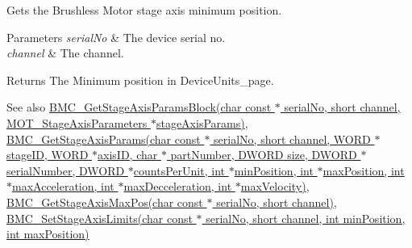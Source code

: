 Gets the Brushless Motor stage axis minimum position. 


\begin{DoxyParams}{Parameters}
{\em serial\+No} & The device serial no. \\
\hline
{\em channel} & The channel. \\
\hline
\end{DoxyParams}
\begin{DoxyReturn}{Returns}
The Minimum position in Device\+Units\+\_\+page. 
\end{DoxyReturn}
\begin{DoxySeeAlso}{See also}
\hyperlink{group___benchtop_brushless_motor_ga62f0ae202868a37a35bab403479ded0e}{B\+M\+C\+\_\+\+Get\+Stage\+Axis\+Params\+Block(char const $\ast$ serial\+No, short channel, M\+O\+T\+\_\+\+Stage\+Axis\+Parameters $\ast$stage\+Axis\+Params)}, \hyperlink{group___benchtop_brushless_motor_ga789b025855ca66786c36428ee7406b02}{B\+M\+C\+\_\+\+Get\+Stage\+Axis\+Params(char const $\ast$ serial\+No, short channel, W\+O\+R\+D $\ast$stage\+I\+D, W\+O\+R\+D $\ast$axis\+I\+D, char $\ast$ part\+Number, D\+W\+O\+R\+D size, D\+W\+O\+R\+D $\ast$serial\+Number, D\+W\+O\+R\+D $\ast$counts\+Per\+Unit, int $\ast$min\+Position, int $\ast$max\+Position, int $\ast$max\+Acceleration, int $\ast$max\+Decceleration, int $\ast$max\+Velocity)}, \hyperlink{group___benchtop_brushless_motor_gaba997567c066a491c2c1c1642cf1a51f}{B\+M\+C\+\_\+\+Get\+Stage\+Axis\+Max\+Pos(char const $\ast$ serial\+No, short channel)}, \hyperlink{group___benchtop_brushless_motor_ga2a2b77d23afc4201493a55a8ced62a6d}{B\+M\+C\+\_\+\+Set\+Stage\+Axis\+Limits(char const $\ast$ serial\+No, short channel, int min\+Position, int max\+Position)}


\end{DoxySeeAlso}
